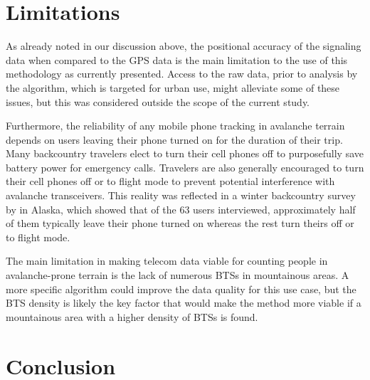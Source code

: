 \documentclass[authordate,empirical, issue]{jote-new-article}
\begin{document}
\newpage
\section{Limitations}



As already noted in our discussion above, the positional accuracy of the signaling data when compared to the GPS data is the main limitation to the use of this methodology as currently presented. Access to the raw data, prior to analysis by the algorithm, which is targeted for urban use, might alleviate some of these issues, but this was considered outside the scope of the current study.







Furthermore, the reliability of any mobile phone tracking in avalanche terrain depends on users leaving their phone turned on for the duration of their trip. Many backcountry travelers elect to turn their cell phones off to purposefully save battery power for emergency calls. Travelers are also generally encouraged to turn their cell phones off or to flight mode to prevent potential interference with avalanche transceivers. This reality was reflected in a winter backcountry survey by \textcite{Ortega2018} in Alaska, which showed that of the 63 users interviewed, approximately half of them typically leave their phone turned on whereas the rest turn theirs off or to flight mode.







The main limitation in making telecom data viable for counting people in avalanche-prone terrain is the lack of numerous BTSs in mountainous areas. A more specific algorithm could improve the data quality for this use case, but the BTS density is likely the key factor that would make the method more viable if a mountainous area with a higher density of BTSs is found.





\section{Conclusion}
\end{document}
